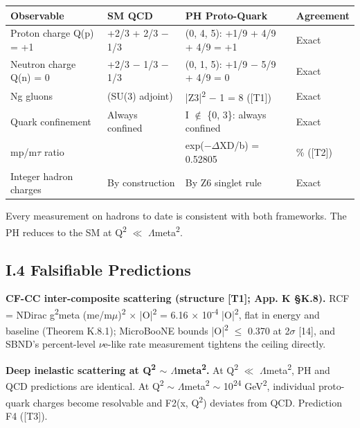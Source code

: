 \documentclass[11pt,letterpaper]{article}
\begin{document}
\begin{footnotesize}\begin{longtable}{|>{\raggedright\arraybackslash}p{}|>{\raggedright\arraybackslash}p{}|>{\raggedright\arraybackslash}p{}|>{\raggedright\arraybackslash}p{}|}
\hline
\textbf{Observable} & \textbf{SM QCD} & \textbf{PH Proto-Quark} & \textbf{Agreement} \\ \hline
Proton charge Q(p) = +1 & +2/3 + 2/3 $-$ 1/3 & (0, 4, 5): +1/9 + 4/9 + 4/9 = +1 & Exact \\ \hline
Neutron charge Q(n) = 0 & +2/3 $-$ 1/3 $-$ 1/3 & (0, 1, 5): +1/9 $-$ 5/9 + 4/9 = 0 & Exact \\ \hline
Ng gluons & 8 (SU(3) adjoint) & |Z3|\textsuperscript{2} $-$ 1 = 8 ([T1]) & Exact \\ \hline
Quark confinement & Always confined & I $\notin$ \{0, 3\}: always confined & Exact \\ \hline
mp/m$\tau$ ratio & 0.52805 & exp($-$$\Delta$XD/b) = 0.52805 & 0.000\% ([T2]) \\ \hline
Integer hadron charges & By construction & By Z6 singlet rule & Exact \\ \hline
\end{longtable}\end{footnotesize}

\noindent Every measurement on hadrons to date is consistent with both frameworks. The PH reduces to the SM at Q\textsuperscript{2} $\ll$ $\Lambda$meta\textsuperscript{2}.

\subsection*{I.4  Falsifiable Predictions}

\noindent \textbf{CF-CC inter-composite scattering (structure [T1]; App. K §K.8). }RCF = NDirac g\textsuperscript{2}meta (me/m$\mu$)\textsuperscript{2} $\times$ |O|\textsuperscript{2} = 6.16 $\times$ 10\textsuperscript{-4} |O|\textsuperscript{2}, flat in energy and baseline (Theorem K.8.1); MicroBooNE bounds |O|\textsuperscript{2} $\le$ 0.370 at 2$\sigma$ [14], and SBND's percent-level $\nu$e-like rate measurement tightens the ceiling directly.

\noindent \textbf{Deep inelastic scattering at Q\textsuperscript{2} $\sim$ $\Lambda$meta\textsuperscript{2}. }At Q\textsuperscript{2} $\ll$ $\Lambda$meta\textsuperscript{2}, PH and QCD predictions are identical. At Q\textsuperscript{2} $\sim$ $\Lambda$meta\textsuperscript{2} $\sim$ 10\textsuperscript{24} GeV\textsuperscript{2}, individual proto-quark charges become resolvable and F2(x, Q\textsuperscript{2}) deviates from QCD. Prediction F4 ([T3]).
\end{document}

